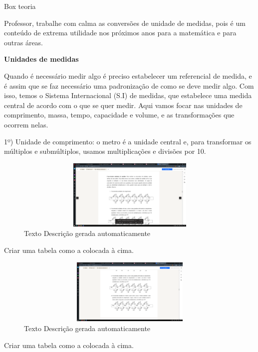 Box teoria

Professor, trabalhe com calma as conversões de unidade de medidas, pois
é um conteúdo de extrema utilidade nos próximos anos para a matemática e
para outras áreas.

\textbf{Unidades de medidas}

Quando é necessário medir algo é preciso estabelecer um referencial de
medida, e é assim que se faz necessário uma padronização de como se deve
medir algo. Com isso, temos o Sistema Internacional (S.I) de medidas,
que estabelece uma medida central de acordo com o que se quer medir.
Aqui vamos focar nas unidades de comprimento, massa, tempo, capacidade e
volume, e as transformações que ocorrem nelas.

1º) {Unidade de comprimento}: o metro é a unidade central e, para
transformar os múltiplos e submúltiplos, usamos multiplicações e
divisões por 10.

\begin{figure}
\centering
\includegraphics[width=5.29167in,height=1.32292in]{./imgSAEB_7_MAT/media/image77.png}
\caption{Texto Descrição gerada automaticamente}
\end{figure}

Criar uma tabela como a colocada à cima.


\begin{figure}
\centering
\includegraphics[width=5.42818in,height=1.23946in]{./imgSAEB_7_MAT/media/image78.png}
\caption{Texto Descrição gerada automaticamente}
\end{figure}

Criar uma tabela como a colocada à cima.

